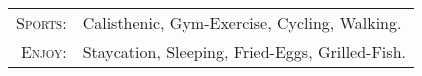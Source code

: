 %
%



\begin{tabular}{rl}
    \textsc{Sports:} & Calisthenic, Gym-Exercise, Cycling, Walking.\\
    \textsc{Enjoy:} & Staycation, Sleeping, Fried-Eggs, Grilled-Fish.\\
\end{tabular}